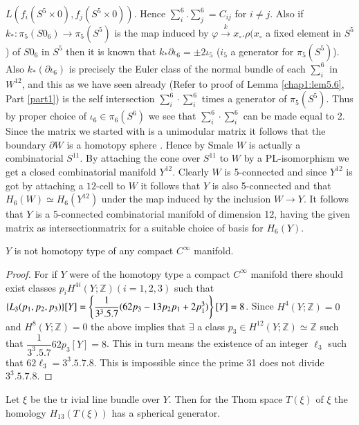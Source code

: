 $L (f_i (S^5 \times 0), f_j (S^5 \times 0))$. Hence $\sum^6_i
. \sum^6_j = C_{ij}$ for $i \neq j$. Also if $k_* : \pi_5 (S0_6) \to
\pi_5 (S^5)$ is the map induced by $\varphi \xrightarrow{k} x_\circ. \rho
( x_\circ$ a fixed element in $S^5$) of $S0_6$ in $S^5$ then it is known
that $k_* \partial \iota_6 = \pm 2 \iota_5$ ($i_5$ a generator for
$\pi_5 (S^5)$). Also $k_* (\partial \iota_6)$ is precisely the Euler
class of the normal bundle of each $\sum^6_i$ in $W^{12}$, and this as
we have seen already (Refer to proof of Lemma \ref{chap1:lem5.6}, Part
\ref{part1}) is the self 
intersection $\sum^6_i \cdot \sum^6_i$ times a generator of $\pi_5
(S^5)$. Thus by proper choice of $\iota_6 \in \pi_6 (S^6)$ we see
that $\sum^6_i \cdot \sum^6_i$ can be made equal to 2. Since the matrix we
started with is a unimodular matrix it follows that the boundary
$\partial W$ is a homotopy sphere \cite{c2:key12}. Hence by Smale  \cite{c2:key10} $W$ is
actually a combinatorial $S^{11}$. By attaching the cone over $S^{11}$
to $W$ by a PL-isomorphism we get a closed combinatorial manifold
$Y^{12}$. Clearly $W$ is 5-connected and since $Y^{12}$ is got by
attaching a $12$-cell to $W$ it follows that $Y$ is also 5-connected
and that $H_6 (W) \simeq H_6 (Y^{12})$ under the map induced by the
inclusion $W \to Y$. It follows that $Y$ is a 5-connected
combinatorial manifold of dimension 12, having the given matrix as
intersection\pageoriginale matrix for a suitable choice of basis for
$H_6 (Y)$. 

\setcounter{lemma}{1}
\begin{lemma}\label{chap2:lem1.2} %
$Y$  is not homotopy type of any compact $C^\infty$ manifold. 
\end{lemma}

\begin{proof}
For if $Y$ were of the homotopy type a compact $C^\infty$ manifold
there should exist classes $p_i H^{4i} (Y; \mathbb{Z}) (i = 1, 2, 3)$
such that $\{L_3 (p_1, p_2, p_3) \}\break [Y] = \left\{\dfrac{1}{3^3. 5.7}
(62p_3 - 13p_2 p_1 + 2p^3_1) \right\} [Y] = 8$.  Since $ H^4 (Y;
\mathbb{Z}) = 0 $ and $H^8 (Y; \mathbb{Z}) = 0$ the above implies
that $\exists$ a class $p_3 \in H^{12} (Y ; \mathbb{Z}) \simeq
\mathbb{Z}$  such that $\dfrac{1}{3^3. 5. 7} 62p_3 [Y] = 8$. This in
turn means the existence of an integer $ \ell_3$ such that $62 \ell_3
= 3^3 .5. 7. 8$. This is impossible since the prime 31 does not divide
$3^3 .5 .7.8$.  
\end{proof}

\begin{lemma}\label{chap2:lem1.3} %
 Let $\xi$ be the tr ivial line bundle over $Y$. Then for the Thom
  space $T(\xi)$ of $\xi$ the homology $H_{13} (T (\xi))$ has a
  spherical generator. 
\end{lemma}

